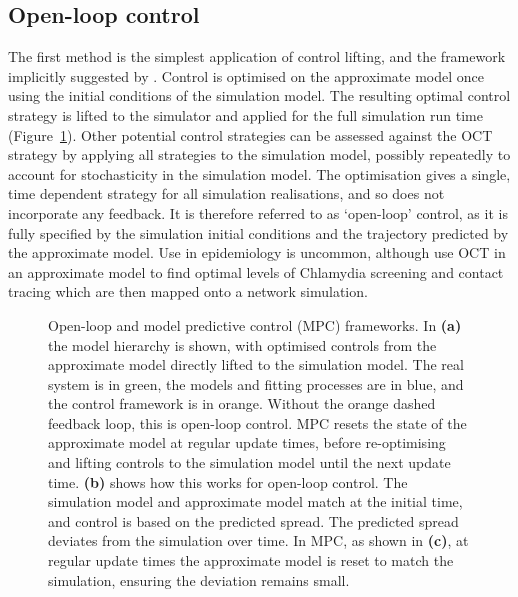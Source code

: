 \subsection{Open-loop control}

The first method is the simplest application of control lifting, and the framework implicitly suggested by \citet{an_optimization_2017}. Control is optimised on the approximate model once using the initial conditions of the simulation model. The resulting optimal control strategy is lifted to the simulator and applied for the full simulation run time (Figure~\ref{fig:ch4:mpc_framework}). Other potential control strategies can be assessed against the OCT strategy by applying all strategies to the simulation model, possibly repeatedly to account for stochasticity in the simulation model. The optimisation gives a single, time dependent strategy for all simulation realisations, and so does not incorporate any feedback. It is therefore referred to as `open-loop' control, as it is fully specified by the simulation initial conditions and the trajectory predicted by the approximate model. Use in epidemiology is uncommon, although \citet{clarke_approximating_2013} use OCT in an approximate model to find optimal levels of Chlamydia screening and contact tracing which are then mapped onto a network simulation.

\begin{figure}
    \begin{center}
    
        \caption[Open-loop and model predictive control frameworks]{Open-loop and model predictive control (MPC) frameworks. In \textbf{(a)} the model hierarchy is shown, with optimised controls from the approximate model directly lifted to the simulation model. The real system is in green, the models and fitting processes are in blue, and the control framework is in orange. Without the orange dashed feedback loop, this is open-loop control. MPC resets the state of the approximate model at regular update times, before re-optimising and lifting controls to the simulation model until the next update time. \textbf{(b)} shows how this works for open-loop control. The simulation model and approximate model match at the initial time, and control is based on the predicted spread. The predicted spread deviates from the simulation over time. In MPC, as shown in \textbf{(c)}, at regular update times the approximate model is reset to match the simulation, ensuring the deviation remains small.
        \label{fig:ch4:mpc_framework}}
    \end{center}
\end{figure}


